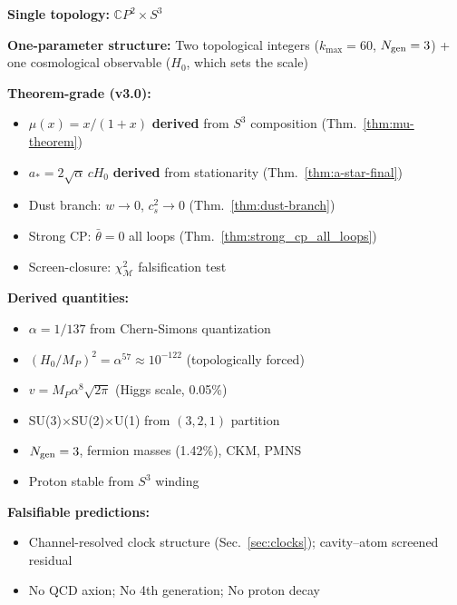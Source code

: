 \begin{tcolorbox}[colback=blue!5!white, colframe=blue!60!black, title=DFD: Unified Framework]
\textbf{Single topology:} $\mathbb{C}P^2 \times S^3$

\textbf{One-parameter structure:} Two topological integers ($k_{\max} = 60$, $N_{\rm gen} = 3$) + one cosmological observable ($H_0$, which sets the scale)

\textbf{Theorem-grade (v3.0):}
\begin{itemize}[nosep]
\item $\mu(x) = x/(1+x)$ \textbf{derived} from $S^3$ composition (Thm.~\ref{thm:mu-theorem})
\item $a_* = 2\sqrt{\alpha}\,cH_0$ \textbf{derived} from stationarity (Thm.~\ref{thm:a-star-final})
\item Dust branch: $w \to 0$, $c_s^2 \to 0$ (Thm.~\ref{thm:dust-branch})
\item Strong CP: $\bar{\theta} = 0$ all loops (Thm.~\ref{thm:strong_cp_all_loops})
\item Screen-closure: $\chi^2_{\mathcal{M}}$ falsification test
\end{itemize}

\textbf{Derived quantities:}
\begin{itemize}[nosep]
\item $\alpha = 1/137$ from Chern-Simons quantization
\item $(H_0/M_P)^2 = \alpha^{57} \approx 10^{-122}$ (topologically forced)
\item $v = M_P \alpha^8 \sqrt{2\pi}$ (Higgs scale, 0.05\%)
\item SU(3)$\times$SU(2)$\times$U(1) from $(3,2,1)$ partition
\item $N_{\rm gen} = 3$, fermion masses (1.42\%), CKM, PMNS
\item Proton stable from $S^3$ winding
\end{itemize}

\textbf{Falsifiable predictions:}
\begin{itemize}[nosep]
\item Channel-resolved clock structure (Sec.~\ref{sec:clocks}); cavity--atom screened residual
\item No QCD axion; No 4th generation; No proton decay
\end{itemize}
\end{tcolorbox}
